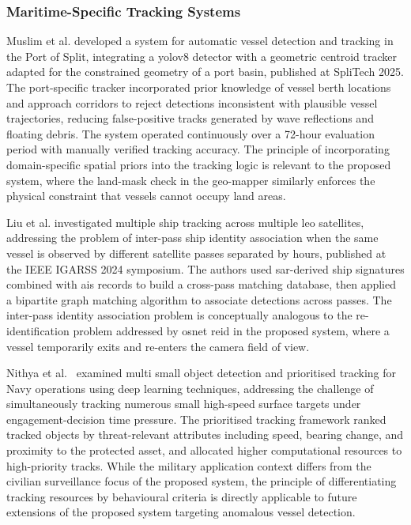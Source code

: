 \subsubsection{\textbf{Maritime-Specific Tracking Systems}}
Muslim et al. \cite{Muslim2025} developed a system for automatic vessel detection
and tracking in the Port of Split, integrating a \gls{yolov8} detector with a geometric
centroid tracker adapted for the constrained geometry of a port basin, published
at SpliTech 2025. The port-specific tracker incorporated prior knowledge of vessel
berth locations and approach corridors to reject detections inconsistent with
plausible vessel trajectories, reducing false-positive tracks generated by wave
reflections and floating debris. The system operated continuously over a 72-hour
evaluation period with manually verified tracking accuracy. The principle of
incorporating domain-specific spatial priors into the tracking logic is relevant
to the proposed system, where the land-mask check in the geo-mapper similarly
enforces the physical constraint that vessels cannot occupy land areas.
 
Liu et al. \cite{Liu2024} investigated multiple ship tracking across multiple \gls{leo}
satellites, addressing the problem of inter-pass ship identity association when
the same vessel is observed by different satellite passes separated by hours,
published at the IEEE IGARSS 2024 symposium. The authors used \gls{sar}-derived ship
signatures combined with \gls{ais} records to build a cross-pass matching database,
then applied a bipartite graph matching algorithm to associate detections across
passes. The inter-pass identity association problem is conceptually analogous to
the re-identification problem addressed by \gls{osnet} \gls{reid} in the proposed system,
where a vessel temporarily exits and re-enters the camera field of view.
 
Nithya et al.\ \cite{Nithya2023} examined multi small object detection and
prioritised tracking for Navy operations using deep learning techniques, addressing
the challenge of simultaneously tracking numerous small high-speed surface targets
under engagement-decision time pressure. The prioritised tracking framework ranked
tracked objects by threat-relevant attributes including speed, bearing change,
and proximity to the protected asset, and allocated higher computational resources
to high-priority tracks. While the military application context differs from the
civilian surveillance focus of the proposed system, the principle of differentiating
tracking resources by behavioural criteria is directly applicable to future
extensions of the proposed system targeting anomalous vessel detection.
 
